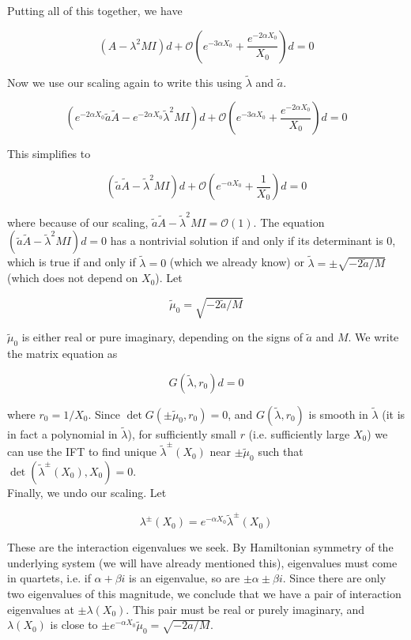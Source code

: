 \documentclass[12pt]{article}
\begin{document}
\begin{enumerate}
Putting all of this together, we have 

\[
(A - \lambda^2 MI )d + \mathcal{O}\left( e^{-3 \alpha X_0} + \frac{e^{-2 \alpha X_0}}{X_0} \right) d = 0
\]

Now we use our scaling again to write this using $\tilde{\lambda}$ and $\tilde{a}$.

\[
(e^{-2\alpha X_0} \tilde{a} \tilde{A} - e^{-2 \alpha X_0} \tilde{\lambda}^2 M I )d + \mathcal{O}\left( e^{-3 \alpha X_0} + \frac{e^{-2 \alpha X_0}}{X_0} \right) d = 0
\]

This simplifies to

\begin{equation}\label{tildeaEq1}
(\tilde{a} \tilde{A} - \tilde{\lambda}^2 M I )d + \mathcal{O}\left( e^{-\alpha X_0} + \frac{1}{X_0} \right) d = 0
\end{equation}

where because of our scaling, $\tilde{a} \tilde{A} - \tilde{\lambda}^2 M I  = \mathcal{O}(1)$. The equation $(\tilde{a} \tilde{A} - \tilde{\lambda}^2 M I )d = 0$ has a nontrivial solution if and only if its determinant is 0, which is true if and only if $\tilde{\lambda} = 0$ (which we already know) or $\tilde{\lambda} = \pm \sqrt{-2 \tilde{a}/M}$ (which does not depend on $X_0$). Let

\[
\tilde{\mu}_0 = \sqrt{-2 \tilde{a}/M}
\]

$\tilde{\mu}_0$ is either real or pure imaginary, depending on the signs of $\tilde{a}$ and $M$. We write the matrix equation \label{tildeaEq1} as

\[
G(\tilde{\lambda}, r_0)d = 0
\]

where $r_0 = 1/X_0$. Since $\det G(\pm \tilde{\mu}_0, r_0) = 0$, and $G(\tilde{\lambda}, r_0)$ is smooth in $\tilde{\lambda}$ (it is in fact a polynomial in $\tilde{\lambda}$), for sufficiently small $r$ (i.e. sufficiently large $X_0$) we can use the IFT to find unique $\tilde{\lambda}^\pm(X_0)$ near $\pm \tilde{\mu}_0$ such that $\det( \tilde{\lambda}^\pm(X_0), X_0) = 0$. \\

Finally, we undo our scaling. Let

\[
\lambda^\pm(X_0) = e^{-\alpha X_0} \tilde{\lambda}^\pm(X_0)
\]

These are the interaction eigenvalues we seek. By Hamiltonian symmetry of the underlying system (we will have already mentioned this), eigenvalues must come in quartets, i.e. if $\alpha + \beta i$ is an eigenvalue, so are $\pm \alpha \pm \beta i$. Since there are only two eigenvalues of this magnitude, we conclude that we have a pair of interaction eigenvalues at $\pm \lambda(X_0)$. This pair must be real or purely imaginary, and $\lambda(X_0)$ is close to $\pm e^{-\alpha X_0} \tilde{\mu}_0 = \sqrt{-2a/M}$.


\end{enumerate}
\end{document}
